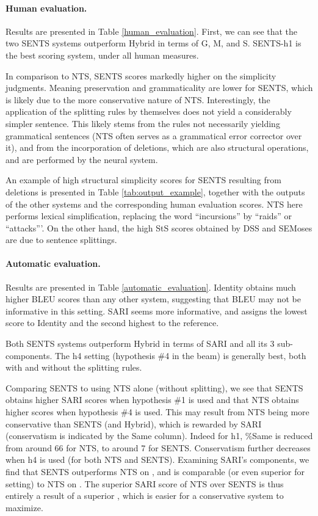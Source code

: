 \documentclass[11pt,a4paper]{article}
\begin{document}
\paragraph{Human evaluation.}
Results are presented in Table \ref{human_evaluation}. 
First, we can see that the two SENTS systems outperform {\sc Hybrid} in terms of G, 
M, and S. SENTS-h1 is the best scoring system, under all human measures.

In comparison to NTS, SENTS scores markedly higher on the simplicity judgments.
Meaning preservation and grammaticality are lower for SENTS, which is likely due to the more
conservative nature of NTS. Interestingly, the application of the splitting rules by themselves
does not yield a considerably simpler sentence. 
This likely stems from the rules not necessarily yielding grammatical sentences
(NTS often serves as a grammatical error corrector over it), and from the incorporation
of deletions, which are also structural operations, and are performed by the neural system.

An example of high structural simplicity scores for SENTS resulting from deletions is presented in Table \ref{tab:output_example}, together with the outputs of the other systems and the corresponding human evaluation scores.
NTS here performs  lexical simplification, replacing the word ``incursions'' by ``raids'' or ``attacks'''.
On the other hand, the high StS scores  obtained by DSS and SEMoses are due to sentence splittings.

\vspace{-0.2cm}
\paragraph{Automatic evaluation.}
Results are presented in Table \ref{automatic_evaluation}.
Identity obtains much higher BLEU scores than any other system, suggesting that BLEU may not be informative in this setting. 
SARI seems more informative, and assigns the lowest score to Identity and the second highest to the reference.

Both SENTS systems outperform {\sc Hybrid} in terms of SARI and all its 3 sub-components. 
The h4 setting (hypothesis \#4 in the beam) is generally best,
both with and without the splitting rules.

Comparing SENTS to using NTS alone (without splitting), 
we see that SENTS obtains higher SARI scores when hypothesis \#1 is used and that NTS obtains 
higher scores when hypothesis \#4 is used.
This may result from NTS being more conservative than SENTS (and {\sc Hybrid}), which is rewarded by SARI
(conservatism is indicated by the Same column). Indeed for h1, \%Same is reduced 
from around 66 for NTS, to around 7 for SENTS. 
Conservatism further decreases when h4 is used (for both NTS and SENTS).
Examining SARI's components, we find that SENTS outperforms NTS on ,
and is comparable (or even superior for  setting) to NTS on . The superior SARI
score of NTS over SENTS is thus entirely a result of a superior , which is easier for a conservative system to maximize. 
\end{document}
